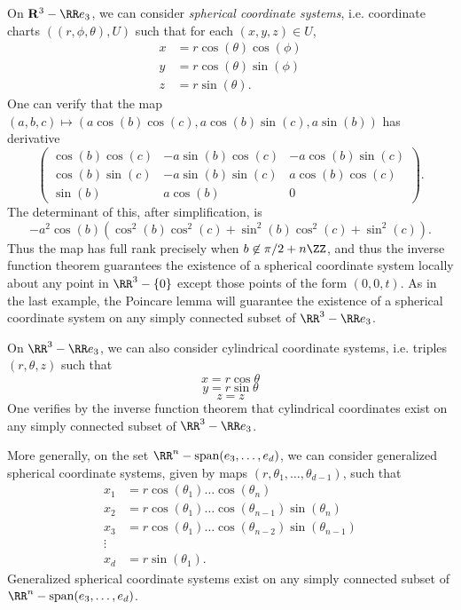 \begin{example}
    On $\mathbf{R}^3 - \RR e_3$, we can consider \emph{spherical coordinate systems}, i.e. coordinate charts $((r,\phi,\theta), U)$ such that for each $(x,y,z) \in U$,
    \begin{align*}
        x &= r \cos(\theta) \cos(\phi)\\
        y &= r \cos(\theta) \sin(\phi)\\
        z &= r \sin(\theta).
    \end{align*}
    One can verify that the map $(a,b,c) \mapsto (a \cos(b) \cos(c), a \cos(b) \sin(c), a \sin(b))$ has derivative
    \[ \begin{pmatrix} \cos(b) \cos(c) & -a \sin(b) \cos(c) & - a \cos(b) \sin(c) \\ \cos(b) \sin(c) & - a \sin(b) \sin(c) & a \cos(b) \cos(c) \\ \sin(b) & a \cos(b) & 0 \end{pmatrix}. \]
    The determinant of this, after simplification, is
    \[ -a^2 \cos(b) (\cos^2(b) \cos^2(c) + \sin^2(b) \cos^2(c) + \sin^2(c)). \]
    Thus the map has full rank precisely when $b \not \in \pi/2 + n \ZZ$, and thus the inverse function theorem guarantees the existence of a spherical coordinate system locally about any point in $\RR^3 - \{ 0 \}$ except those points of the form $(0,0,t)$. As in the last example, the Poincare lemma will guarantee the existence of a spherical coordinate system on any simply connected subset of $\RR^3 - \RR e_3$.
\end{example}

\begin{example}
    On $\RR^3 - \RR e_3$, we can also consider cylindrical coordinate systems, i.e. triples $(r,\theta,z)$ such that
    \[ x = r \cos \theta \]
    \[ y = r \sin \theta \]
    \[ z = z \]
    One verifies by the inverse function theorem that cylindrical coordinates exist on any simply connected subset of $\RR^3 - \RR e_3$.
\end{example}

\begin{example}
    More generally, on the set $\RR^n - \text{span}(e_3, \dots, e_d)$, we can consider generalized spherical coordinate systems, given by maps $(r,\theta_1, \dots, \theta_{d-1})$, such that
    \begin{align*}
        x_1 &= r \cos(\theta_1) \dots \cos(\theta_n)\\
        x_2 &= r \cos(\theta_1) \dots \cos(\theta_{n-1}) \sin(\theta_n)\\
        x_3 &= r \cos(\theta_1) \dots \cos(\theta_{n-2}) \sin(\theta_{n-1})\\
        \vdots\\
        x_d &= r \sin(\theta_1).
    \end{align*}
    Generalized spherical coordinate systems exist on any simply connected subset of $\RR^n - \text{span}(e_3, \dots, e_d)$.
\end{example} 

